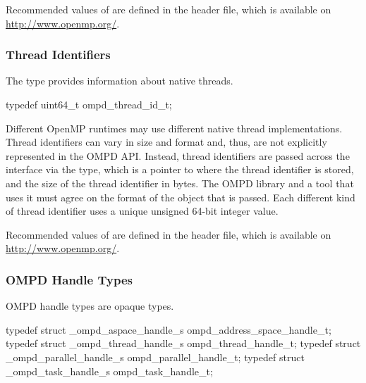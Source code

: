 Recommended values of  are defined in the 
header file, which is available on \url{http://www.openmp.org/}.



\subsubsection{Thread Identifiers}
\label{ompd:ompd_thread_id_t}

\summary
The  type provides information about native threads.

\format
\begin{ccppspecific}
\begin{ompSyntax}
typedef uint64_t ompd_thread_id_t;
\end{ompSyntax}
\end{ccppspecific}

\descr
Different OpenMP runtimes may use different native thread implementations.
Thread identifiers can vary in size and format and, thus, are not explicitly 
represented in the OMPD API. Instead, thread identifiers are passed across 
the interface via the  type, which is a pointer to where
the thread identifier is stored, and the size of the thread identifier in bytes.
The OMPD library and a tool that uses it must agree on the format of the object 
that is passed. Each different kind of thread identifier uses a unique
unsigned 64-bit integer value.

Recommended values of  are defined in the 
 header file, which is available on 
\url{http://www.openmp.org/}.



\subsubsection{OMPD Handle Types}
\label{subsubsec:ompd_address_space_handle_t}
\label{subsubsec:ompd_thread_handle_t}
\label{subsubsec:ompd_parallel_handle_t}
\label{subsubsec:ompd_task_handle_t}

\summary
OMPD handle types are opaque types.

\format
\begin{ccppspecific}
\begin{ompSyntax}
typedef struct _ompd_aspace_handle_s ompd_address_space_handle_t;
typedef struct _ompd_thread_handle_s ompd_thread_handle_t;
typedef struct _ompd_parallel_handle_s ompd_parallel_handle_t;
typedef struct _ompd_task_handle_s ompd_task_handle_t;
\end{ompSyntax}
\end{ccppspecific}

